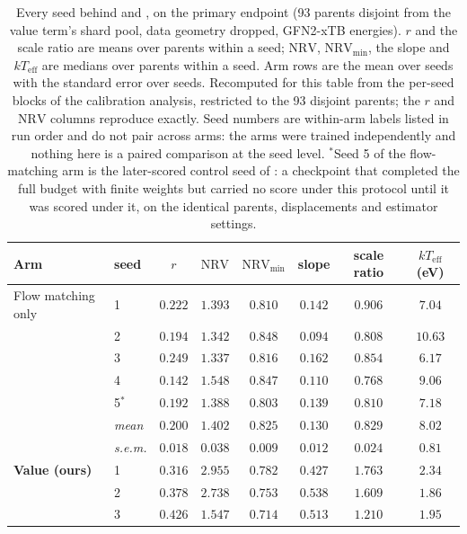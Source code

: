 \begin{table}[h]
\caption{Every seed behind  and , on the
primary endpoint (93 parents disjoint from the value term's shard pool, data geometry
dropped, GFN2-xTB energies). $r$ and the scale ratio are means over parents
within a seed; $\mathrm{NRV}$, $\mathrm{NRV}_{\min}$, the slope and
$kT_{\mathrm{eff}}$ are medians over parents within a seed. Arm rows are the mean over
seeds with the standard error over seeds. Recomputed for this table from the per-seed
blocks of the calibration analysis, restricted to the 93 disjoint parents; the $r$ and
$\mathrm{NRV}$ columns reproduce  exactly. Seed numbers are
within-arm labels listed in run order and do not pair across arms: the arms were
trained independently and nothing here is a paired comparison at the seed level.
$^{\ast}$Seed 5 of the flow-matching arm is the later-scored control seed of
: a checkpoint that completed the full budget with finite weights but
carried no score under this protocol until it was scored under it, on the identical
parents, displacements and estimator settings.}
\label{tab:scaleseeds}
\begin{center}
\footnotesize
\setlength{\tabcolsep}{4pt}
\begin{tabular}{llcccccc}
\toprule
Arm & seed & $r$ & $\mathrm{NRV}$ & $\mathrm{NRV}_{\min}$ & slope & scale ratio & $kT_{\mathrm{eff}}$ (eV) \\
\midrule
Flow matching only
 & 1 & $0.222$ & $1.393$ & $0.810$ & $0.142$ & $0.906$ & $7.04$ \\
 & 2 & $0.194$ & $1.342$ & $0.848$ & $0.094$ & $0.808$ & $10.63$ \\
 & 3 & $0.249$ & $1.337$ & $0.816$ & $0.162$ & $0.854$ & $6.17$ \\
 & 4 & $0.142$ & $1.548$ & $0.847$ & $0.110$ & $0.768$ & $9.06$ \\
 & 5$^{\ast}$ & $0.192$ & $1.388$ & $0.803$ & $0.139$ & $0.810$ & $7.18$ \\
 & \emph{mean} & $0.200$ & $1.402$ & $0.825$ & $0.130$ & $0.829$ & $8.02$ \\
 & \emph{s.e.m.} & $0.018$ & $0.038$ & $0.009$ & $0.012$ & $0.024$ & $0.81$ \\
\midrule
\textbf{Value (ours)}
 & 1 & $0.316$ & $2.955$ & $0.782$ & $0.427$ & $1.763$ & $2.34$ \\
 & 2 & $0.378$ & $2.738$ & $0.753$ & $0.538$ & $1.609$ & $1.86$ \\
 & 3 & $0.426$ & $1.547$ & $0.714$ & $0.513$ & $1.210$ & $1.95$ \\

\end{tabular}
\end{center}
\end{table}
